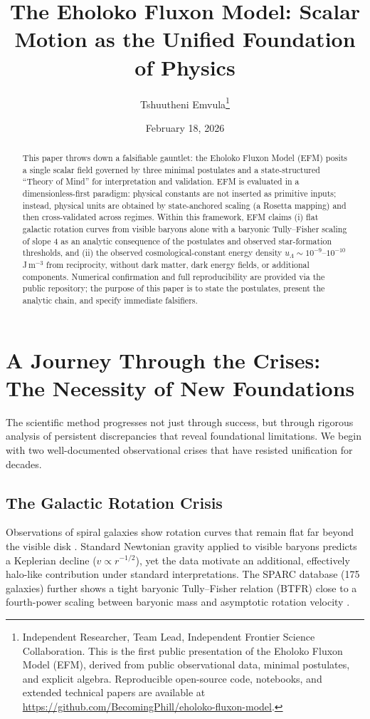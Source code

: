\documentclass[11pt, twoside]{article}
\title{The Eholoko Fluxon Model: Scalar Motion as the Unified Foundation of Physics}
\author{Tshuutheni Emvula\thanks{Independent Researcher, Team Lead, Independent Frontier Science Collaboration. This is the first public presentation of the Eholoko Fluxon Model (EFM), derived from public observational data, minimal postulates, and explicit algebra. Reproducible open-source code, notebooks, and extended technical papers are available at \url{https://github.com/BecomingPhill/eholoko-fluxon-model}.}}
\date{February 18, 2026}
\begin{document}
\maketitle
\thispagestyle{empty}

\begin{abstract}
This paper throws down a falsifiable gauntlet: the Eholoko Fluxon Model (EFM) posits a single scalar field governed by three minimal postulates and a state-structured ``Theory of Mind'' for interpretation and validation. EFM is evaluated in a dimensionless-first paradigm: physical constants are not inserted as primitive inputs; instead, physical units are obtained by state-anchored scaling (a Rosetta mapping) and then cross-validated across regimes.
Within this framework, EFM claims (i) flat galactic rotation curves from visible baryons alone with a baryonic Tully--Fisher scaling of slope 4 as an analytic consequence of the postulates and observed star-formation thresholds, and (ii) the observed cosmological-constant energy density $u_\Lambda \sim 10^{-9}$--$10^{-10}$\,J\,m$^{-3}$ from reciprocity, without dark matter, dark energy fields, or additional components. Numerical confirmation and full reproducibility are provided via the public repository; the purpose of this paper is to state the postulates, present the analytic chain, and specify immediate falsifiers.
\end{abstract}

\clearpage
\tableofcontents
\clearpage

\section{A Journey Through the Crises: The Necessity of New Foundations}
The scientific method progresses not just through success, but through rigorous analysis of persistent discrepancies that reveal foundational limitations. We begin with two well-documented observational crises that have resisted unification for decades.

\subsection{The Galactic Rotation Crisis}
Observations of spiral galaxies show rotation curves that remain flat far beyond the visible disk \citep{rubin1980,lelli2016}. Standard Newtonian gravity applied to visible baryons predicts a Keplerian decline ($v \propto r^{-1/2}$), yet the data motivate an additional, effectively halo-like contribution under standard interpretations. The SPARC database (175 galaxies) further shows a tight baryonic Tully--Fisher relation (BTFR) close to a fourth-power scaling between baryonic mass and asymptotic rotation velocity \citep{lelli2016,schombert2020}.
\end{document}
